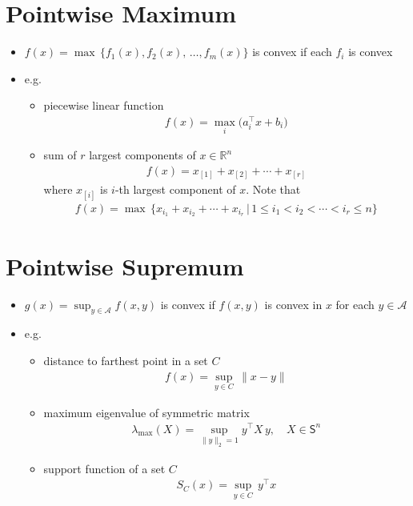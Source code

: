 \documentclass[11pt]{extarticle}
\newcommand{\ds}{\displaystyle}
\theoremstyle{definition}
\begin{document}
\section*{Pointwise Maximum}

\begin{itemize}
  \item $\ds f(x) = \max\,\{f_1(x),f_2(x),\,\ldots,f_m(x)\}$ is convex if each $f_i$ is convex
  \item e.g.
    \begin{itemize}
      \item piecewise linear function
        \begin{align*}
          f(x) = \max_i\big(a_i^\top x + b_i\big)
        \end{align*}
      \item sum of $r$ largest components of $x\in\mathbb{R}^n$  
        \begin{align*}
          f(x) = x_{[1]} + x_{[2]} + \cdots + x_{[r]}
        \end{align*}
        where $x_{[i]}$ is $i$-th largest component of $x$. Note that
        \begin{align*}
          f(x) = \max\,\{x_{i_1} + x_{i_2} + \cdots + x_{i_r}\,|\,1\leqslant i_1 < i_2 < \cdots < i_r\leqslant n\}
        \end{align*}
    \end{itemize}
\end{itemize}

\newpage

\section*{Pointwise Supremum}

\begin{itemize}
  \item $\ds g(x) = \sup_{y\in\mathcal{A}}f(x, y)$ is convex if $f(x, y)$ is convex in $x$ for each $y\in\mathcal{A}$
  \item e.g.
    \begin{itemize}
      \item distance to farthest point in a set $C$
        \begin{align*}
          f(x) = \sup_{y\in C}\,\|x - y\|
        \end{align*}
      \item maximum eigenvalue of symmetric matrix 
        \begin{align*}
          \lambda_{\text{max}}(X) = \sup_{\|y\|_2 = 1} y^\top X\,y, \quad X\in\mathsf{S}^n 
        \end{align*}
      \item support function of a set $C$
        \begin{align*}
          S_C(x) = \sup_{y\in C}\,y^\top x
        \end{align*}
    \end{itemize}
\end{itemize}
\end{document}
